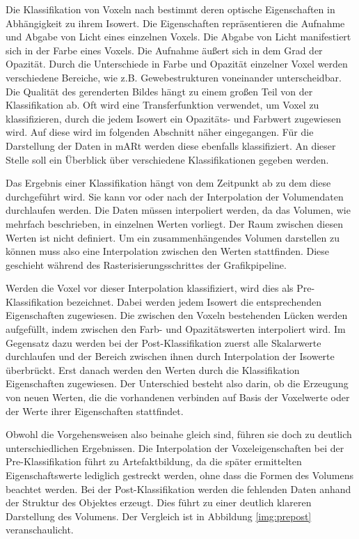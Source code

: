 Die Klassifikation von Voxeln nach \cite{Hadwiger06} bestimmt deren optische Eigenschaften in Abhängigkeit zu ihrem Isowert. Die Eigenschaften repräsentieren die Aufnahme und Abgabe von Licht eines einzelnen Voxels. Die Abgabe von Licht manifestiert sich in der Farbe eines Voxels. Die Aufnahme äußert sich in dem Grad der Opazität. Durch die Unterschiede in Farbe und Opazität einzelner Voxel werden verschiedene Bereiche, wie z.B. Gewebestrukturen voneinander unterscheidbar. Die Qualität des gerenderten Bildes hängt zu einem großen Teil von der Klassifikation ab. Oft wird eine Transferfunktion verwendet, um Voxel zu klassifizieren, durch die jedem Isowert ein Opazitäts- und Farbwert zugewiesen wird. Auf diese wird im folgenden Abschnitt näher eingegangen. 
Für die Darstellung der Daten in mARt werden diese ebenfalls klassifiziert. An dieser Stelle soll ein Überblick über verschiedene Klassifikationen gegeben werden.

Das Ergebnis einer Klassifikation hängt von dem Zeitpunkt ab zu dem diese durchgeführt wird. Sie kann vor oder nach der Interpolation der Volumendaten durchlaufen werden.
Die Daten müssen interpoliert werden, da das Volumen, wie mehrfach beschrieben, in einzelnen Werten vorliegt. Der Raum zwischen diesen Werten ist nicht definiert. Um ein zusammenhängendes Volumen darstellen zu können muss also eine Interpolation zwischen den Werten stattfinden. Diese geschieht während des Rasterisierungsschrittes der Grafikpipeline.

Werden die Voxel vor dieser Interpolation klassifiziert, wird dies als Pre-Klassifikation bezeichnet. Dabei werden jedem Isowert die entsprechenden Eigenschaften zugewiesen. Die zwischen den Voxeln bestehenden Lücken werden aufgefüllt, indem zwischen den Farb- und Opazitätswerten interpoliert wird. 
Im Gegensatz dazu werden bei der Post-Klassifikation zuerst alle Skalarwerte durchlaufen und der Bereich zwischen ihnen durch Interpolation der Isowerte überbrückt. Erst danach werden den Werten durch die Klassifikation Eigenschaften zugewiesen. Der Unterschied besteht also darin, ob die Erzeugung von neuen Werten, die die vorhandenen verbinden auf Basis der Voxelwerte oder der Werte ihrer Eigenschaften stattfindet. 

Obwohl die Vorgehensweisen also beinahe gleich sind, führen sie doch zu deutlich unterschiedlichen Ergebnissen. Die Interpolation der Voxeleigenschaften bei der Pre-Klassifikation führt zu Artefaktbildung, da die später ermittelten Eigenschaftswerte lediglich gestreckt werden, ohne dass die Formen des Volumens beachtet werden. Bei der Post-Klassifikation werden die fehlenden Daten anhand der Struktur des Objektes erzeugt. Dies führt zu einer deutlich klareren Darstellung des Volumens. Der Vergleich ist in Abbildung \ref{img:prepost} veranschaulicht.


